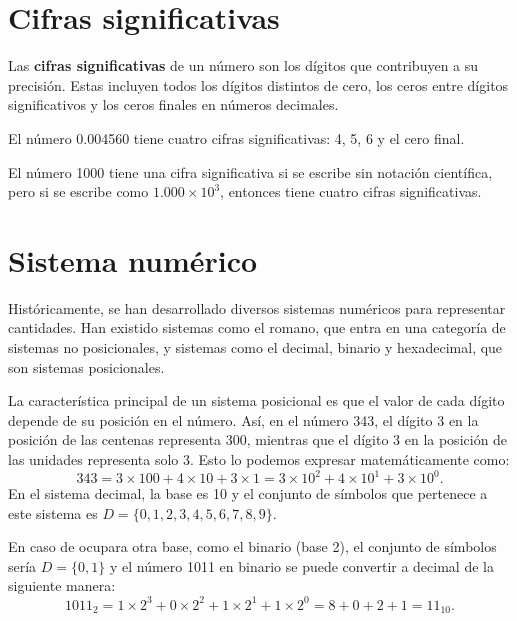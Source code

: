 \documentclass[a4,11pt]{aleph-notas}
\begin{document}
\encabezado


\section{Cifras significativas}

\begin{defi}
    Las \textbf{cifras significativas} de un número son los dígitos que contribuyen a su precisión. Estas incluyen todos los dígitos distintos de cero, los ceros entre dígitos significativos y los ceros finales en números decimales.
\end{defi}

\begin{ejem}
    El número 0.004560 tiene cuatro cifras significativas: 4, 5, 6 y el cero final.
\end{ejem}

\begin{ejem}
    El número 1000 tiene una cifra significativa si se escribe sin notación científica, pero si se escribe como $1.000 \times 10^3$, entonces tiene cuatro cifras significativas.
\end{ejem}

\section{Sistema numérico}

Históricamente, se han desarrollado diversos sistemas numéricos para representar cantidades. Han existido sistemas como el romano, que entra en una categoría de sistemas no posicionales, y sistemas como el decimal, binario y hexadecimal, que son sistemas posicionales.

La característica principal de un sistema posicional es que el valor de cada dígito depende de su posición en el número. Así, en el número 343, el dígito 3 en la posición de las centenas representa 300, mientras que el dígito 3 en la posición de las unidades representa solo 3. Esto lo podemos expresar matemáticamente como:
\[
343 = 3 \times 100 + 4 \times 10 + 3 \times 1 = 3 \times 10^2 + 4 \times 10^1 + 3 \times 10^0.
\]
En el sistema decimal, la base es 10 y el conjunto de símbolos que pertenece a este sistema es $D = \{0, 1, 2, 3, 4, 5, 6, 7, 8, 9\}$.

En caso de ocupara otra base, como el binario (base 2), el conjunto de símbolos sería $D = \{0, 1\}$ y el número 1011 en binario se puede convertir a decimal de la siguiente manera:
\[
1011_2 = 1 \times 2^3 + 0 \times 2^2 + 1 \times 2^1 + 1 \times 2^0 = 8 + 0 + 2 + 1 = 11_{10}.
\]
\end{document}
